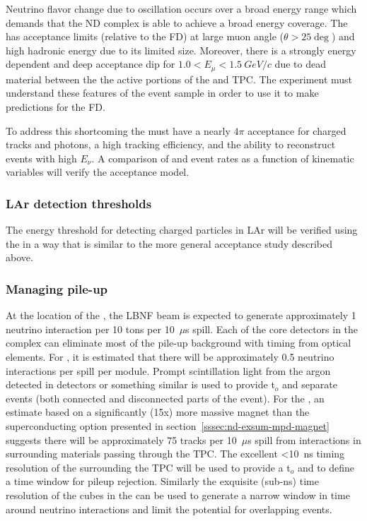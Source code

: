 Neutrino flavor change due to oscillation occurs over a broad energy range which demands that the ND complex is able to achieve a broad energy coverage. The \larnd has acceptance limits (relative to the FD) at large muon angle ($\theta > 25\deg$) and high hadronic energy due to its limited size. Moreover, there is a strongly energy dependent and deep acceptance dip for $1.0 < E_\mu < 1.5~GeV/c$ due to dead material between the the active portions of the \larnd and  TPC. The experiment must understand these features of the \larnd event sample in order to use it to make predictions for the FD. 

To address this shortcoming the  must have a nearly $4\pi$ acceptance for charged tracks and photons, a high tracking efficiency, and the ability to reconstruct events with high $E_\nu$. A comparison of  and \larnd event rates as a function of kinematic variables will verify the \larnd acceptance model. 



\subsubsection{LAr detection thresholds}

The energy threshold for detecting charged particles in LAr will be verified using the  in a way that is similar to the more general \larnd acceptance study described above. 

\subsubsection{Managing pile-up}
At the location of the  , the LBNF beam is expected to generate approximately 1 neutrino interaction per 10 tons per 10~$\mu$s spill.   
Each of the core detectors in the  complex can eliminate most of the pile-up background with timing from optical elements. For , it is estimated that there will be approximately 0.5 neutrino interactions per spill per  module. Prompt scintillation light from the argon detected in  detectors or something similar is used to provide t$_{o}$ and separate events (both connected and disconnected parts of the event).  For the , an estimate based on a significantly (15x) more massive magnet than the superconducting option presented in section~\ref{sssec:nd-exsum-mpd-magnet} suggests there will be approximately 75 tracks per 10~$\mu$s spill from interactions in surrounding materials passing through the TPC.  The excellent <10~ns timing resolution of the  surrounding the TPC will be used to provide a t$_{o}$ and to define a time window for pileup rejection.  Similarly the exquisite (sub-ns) time resolution of the cubes in the  can be used to generate a narrow window in time around neutrino interactions and limit the potential for overlapping events.  



